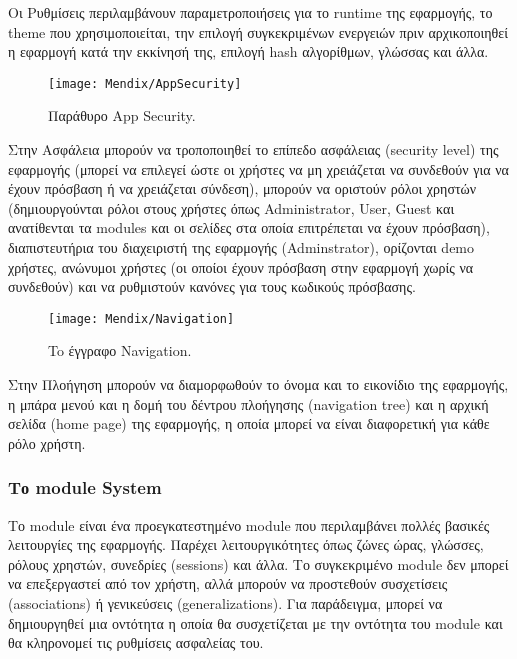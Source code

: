             Οι Ρυθμίσεις περιλαμβάνουν παραμετροποιήσεις για το runtime της εφαρμογής, το theme που χρησιμοποιείται, την επιλογή συγκεκριμένων ενεργειών πριν αρχικοποιηθεί η εφαρμογή κατά την εκκίνησή της, επιλογή hash αλγορίθμων, γλώσσας και άλλα.

            \begin{figure}[h!] \noindent \centering
                    \texttt{[image: Mendix/AppSecurity]}
                    \caption{\centering Παράθυρο App Security.}
            \end{figure}

            Στην Ασφάλεια μπορούν να τροποποιηθεί το επίπεδο ασφάλειας (security level) της εφαρμογής (μπορεί να επιλεγεί ώστε οι χρήστες να μη χρειάζεται να συνδεθούν για να έχουν πρόσβαση ή να χρειάζεται σύνδεση), μπορούν να οριστούν ρόλοι χρηστών (δημιουργούνται ρόλοι στους χρήστες όπως Administrator, User, Guest και ανατίθενται τα modules και οι σελίδες στα οποία επιτρέπεται να έχουν πρόσβαση), διαπιστευτήρια του διαχειριστή της εφαρμογής (Adminstrator), ορίζονται demo χρήστες, ανώνυμοι χρήστες (οι οποίοι έχουν πρόσβαση στην εφαρμογή χωρίς να συνδεθούν) και να ρυθμιστούν κανόνες για τους κωδικούς πρόσβασης.

            \begin{figure}[h!] \noindent \centering
                    \texttt{[image: Mendix/Navigation]}
                    \caption{\centering To έγγραφο Navigation.}
            \end{figure}

            Στην Πλοήγηση μπορούν να διαμορφωθούν το όνομα και το εικονίδιο της εφαρμογής, η μπάρα μενού και η δομή του δέντρου πλοήγησης (navigation tree) και η αρχική σελίδα (home page) της εφαρμογής, η οποία μπορεί να είναι διαφορετική για κάθε ρόλο χρήστη. \cite{mendixDoc}

            \subsubsection{Το module System}
                Το module  είναι ένα προεγκατεστημένο module που περιλαμβάνει πολλές βασικές λειτουργίες της εφαρμογής. Παρέχει λειτουργικότητες όπως ζώνες ώρας, γλώσσες, ρόλους χρηστών, συνεδρίες (sessions) και άλλα. Το συγκεκριμένο module δεν μπορεί να επεξεργαστεί από τον χρήστη, αλλά μπορούν να προστεθούν συσχετίσεις (associations) ή γενικεύσεις (generalizations). Για παράδειγμα, μπορεί να δημιουργηθεί μια οντότητα  η οποία θα συσχετίζεται με την οντότητα  του module  και θα κληρονομεί τις ρυθμίσεις ασφαλείας του. \cite{mendixSystemModule}

